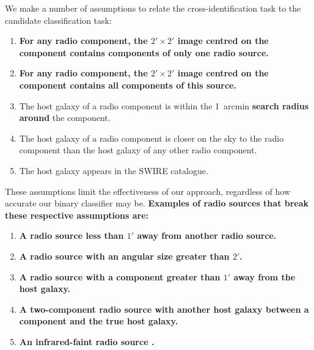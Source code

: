 \documentclass[fleqn,usenatbib,usedcolumn]{mnras}
\newcommand{\edited}[1]{{\bf {#1}}}
\begin{document}
    We make a number of assumptions to relate the cross-identification task to
    the candidate classification task:
    \begin{enumerate}
      \item \edited{For any radio component, the $2' \times 2'$ image centred on the component contains components of only one radio source.}
      \item \edited{For any radio component, the $2' \times 2'$ image centred on the component contains all components of this source.}
      \item The host galaxy of a radio component is within the 1~arcmin \edited{search radius around} the
        component.
      \item The host galaxy of a radio component is closer on the sky to the
        radio component than the host galaxy of any other radio component.
      \item The host galaxy appears in the SWIRE catalogue.
    \end{enumerate}
    These assumptions limit the effectiveness of our approach, regardless of
    how accurate our binary classifier may be. \edited{Examples of radio sources that break these respective assumptions are:}
    \begin{enumerate}
      \item \edited{A radio source less than $1'$ away from another radio source.}
      \item \edited{A radio source with an angular size greater than $2'$.}
      \item \edited{A radio source with a component greater than $1'$ away from the host galaxy.}
      \item \edited{A two-component radio source with another host galaxy between a component and the true host galaxy.}
      \item \edited{An infrared-faint radio source \citep[as in][]{collier14irfaint}.}
    \end{enumerate}
\end{document}
